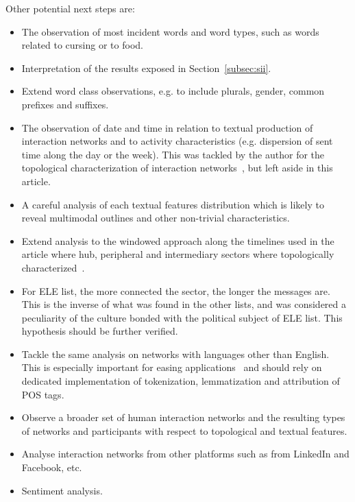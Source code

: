 \documentclass[%
 aip,
 jmp,%
 amsmath,amssymb,
 reprint,%
]{revtex4-1}
\begin{document}
Other potential next steps are:
\begin{itemize}
    \item The observation of most incident words and word types,
	    such as words related to cursing or to food.
    \item Interpretation of the results
	    exposed in Section~\ref{subsec:sii}.
    \item Extend word class observations, e.g. to include plurals, gender, common prefixes and suffixes.
    \item The observation of date and time in relation to textual production of interaction networks and
	    to activity characteristics (e.g. dispersion of sent time along the day or the week).
	    This was tackled by the author for the topological characterization of interaction networks~\cite{evoSN}, but left aside in this article.
    \item A careful analysis of each textual features distribution which is likely to reveal multimodal outlines and other non-trivial characteristics.
    \item Extend analysis to the windowed approach along the timelines used in the article where hub, peripheral and intermediary sectors where topologically characterized~\cite{evoSN}.
    \item For ELE list, the more connected the sector, the longer the messages are.
	    This is the inverse of what was found in the other lists,
	    and was considered a peculiarity of the culture bonded with the political subject of ELE list.
	    This hypothesis should be further verified.
    \item Tackle the same analysis on networks with languages other than English.
	    This is especially important for easing applications~\cite{ensaio}
	    and should rely on dedicated implementation of 
	    tokenization, lemmatization and attribution of POS tags.
    \item Observe a broader set of human interaction networks and the resulting types
	    of networks and participants with respect to topological and textual features.
    \item Analyse interaction networks from other platforms such as from LinkedIn and Facebook, etc.
    \item Sentiment analysis.
\end{itemize}
\end{document}
